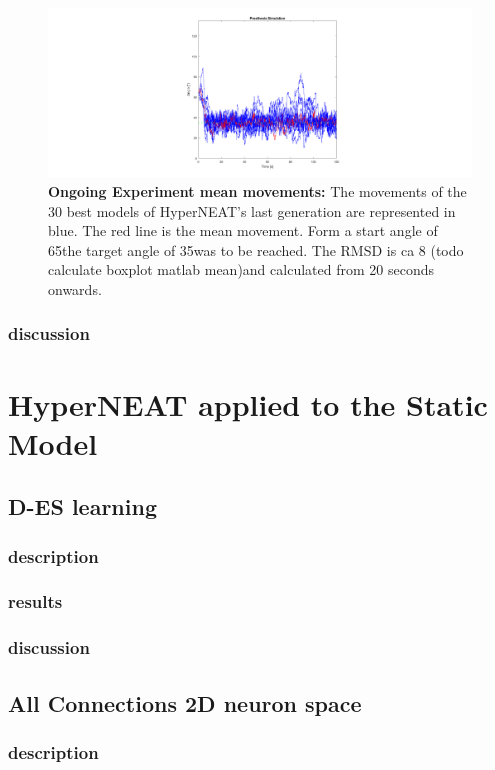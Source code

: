\begin{figure}[tb]
	\centering
	\includegraphics[width=0.7\linewidth]{figures/OngoingModel/meanMovement35deg}
	\caption[Ongoing Experiment mean movements]{\textbf{Ongoing Experiment mean movements:} The movements of the 30 best models of HyperNEAT's last generation are represented in blue. The red line is the mean movement. Form a start angle of 65\degree  the target angle of 35\degree was to be reached. The RMSD is ca 8 (todo calculate boxplot matlab mean)\degree and calculated from 20 seconds onwards. }
	\label{fig:meanmovement35deg}
\end{figure}


\subsubsection{discussion}
\section{HyperNEAT applied to the Static Model}
\subsection{D-ES learning}
\subsubsection{description}
\subsubsection{results}
\subsubsection{discussion}
\subsection{All Connections 2D neuron space}
\subsubsection{description}
